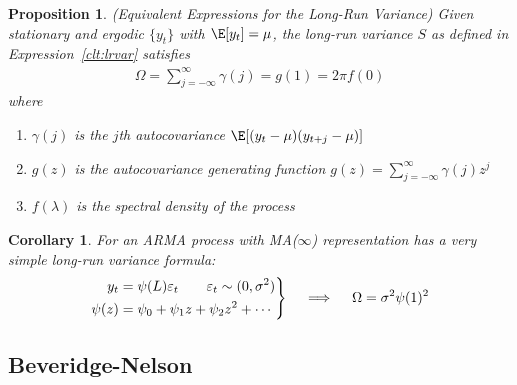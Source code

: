 \documentclass[12pt]{article}
\theoremstyle{plain}
\newtheorem{prop}[thm]{Proposition}
\newtheorem{cor}[thm]{Corollary}
\theoremstyle{definition}
\theoremstyle{remark}
\newenvironment{rcases}
  {\left.\begin{aligned}}
  {\end{aligned}\right\rbrace}
\begin{document}
\begin{prop}
\emph{(Equivalent Expressions for the Long-Run Variance)}
Given stationary and ergodic $\{y_t\}$ with $\E[y_t]=\mu$, the long-run
variance $S$ as defined in Expression~\ref{clt:lrvar} satisfies
\begin{align*}
  \Omega = \sum_{j=-\infty}^\infty \gamma(j) = g(1) = 2\pi f(0)
\end{align*}
where
\begin{enumerate}[label=\emph{(\roman*)}]
  \item $\gamma(j)$ is the $j$th autocovariance
    $\E[(y_t-\mu)(y_{t+j}-\mu)]$
  \item $g(z)$ is the autocovariance generating function
    $g(z)=\sum_{j=-\infty}^\infty \gamma(j)z^j$
  \item $f(\lambda)$ is the spectral density of the process
\end{enumerate}
\end{prop}

\begin{cor}
For an ARMA process with MA($\infty$) representation has a very simple
long-run variance formula:
\begin{align*}
  \begin{rcases}
  y_t &= \psi(L)\varepsilon_t
  \qquad \varepsilon_t \sim (0,\sigma^2) \\
  \psi(z) &= \psi_0 + \psi_1z + \psi_2z^2 + \cdots
  \end{rcases}
  \quad\implies\quad
  \Omega = \sigma^2 \psi(1)^2
\end{align*}
\end{cor}

\clearpage
\subsection{Beveridge-Nelson}
\end{document}
